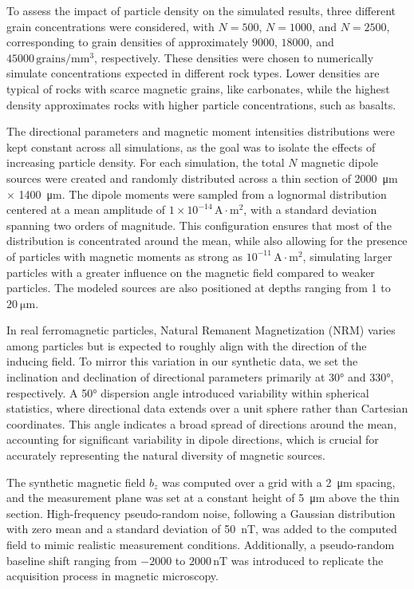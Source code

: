 To assess the impact of particle density on the simulated results, three different grain concentrations were considered, with \(N=500\), \(N=1000\), and \(N=2500\), corresponding to grain densities of approximately \(9000\), \(18000\), and \(45000\,\mathrm{grains/mm^3}\), respectively. These densities were chosen to numerically simulate concentrations expected in different rock types. Lower densities are typical of rocks with scarce magnetic grains, like carbonates, while the highest density approximates rocks with higher particle concentrations, such as basalts.

The directional parameters and magnetic moment intensities distributions were kept constant across all simulations, as the goal was to isolate the effects of increasing particle density. For each simulation, the total \(N\) magnetic dipole sources were created and randomly distributed across a thin section of \qty{2000}{\um} \(\times\) \qty{1400}{\um}. The dipole moments were sampled from a lognormal distribution centered at a mean amplitude of \(1 \times 10^{-14}\,\mathrm{A \cdot m^2}\), with a standard deviation spanning two orders of magnitude. This configuration ensures that most of the distribution is concentrated around the mean, while also allowing for the presence of particles with magnetic moments as strong as \(10^{-11}\,\mathrm{A \cdot m^2}\), simulating larger particles with a greater influence on the magnetic field compared to weaker particles. The modeled sources are also positioned at depths ranging from 1 to \(\qty{20}{\micro\meter}\).

In real ferromagnetic particles, Natural Remanent Magnetization (NRM) varies among particles but is expected to roughly align with the direction of the inducing field. To mirror this variation in our synthetic data, we set the inclination and declination of directional parameters primarily at 30° and 330°, respectively. A 50° dispersion angle introduced variability within spherical statistics, where directional data extends over a unit sphere rather than Cartesian coordinates. This angle indicates a broad spread of directions around the mean, accounting for significant variability in dipole directions, which is crucial for accurately representing the natural diversity of magnetic sources.

The synthetic magnetic field \(b_z\) was computed over a grid with a \qty{2}{\um} spacing, and the measurement plane was set at a constant height of \qty{5}{\um} above the thin section. High-frequency pseudo-random noise, following a Gaussian distribution with zero mean and a standard deviation of \qty{50}{\nano\tesla}, was added to the computed field to mimic realistic measurement conditions. Additionally, a pseudo-random baseline shift ranging from \(-2000\) to \(2000\,\mathrm{nT}\) was introduced to replicate the acquisition process in magnetic microscopy.

